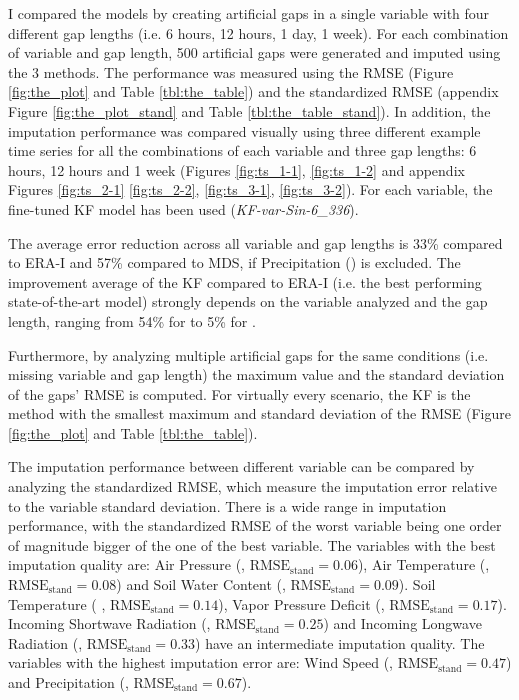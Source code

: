 \documentclass{article}
\begin{document}
I compared the models by creating artificial gaps in a single variable with four different gap lengths (i.e. 6 hours, 12 hours, 1 day, 1 week).
For each combination of variable and gap length, 500 artificial gaps were generated and imputed using the 3 methods. The performance was measured using the RMSE (Figure \ref{fig:the_plot} and Table \ref{tbl:the_table}) and the standardized RMSE (appendix Figure \ref{fig:the_plot_stand} and Table \ref{tbl:the_table_stand}). In addition, the imputation performance was compared visually using three different example time series for all the combinations of each variable and three gap lengths: 6 hours, 12 hours and 1 week (Figures \ref{fig:ts_1-1}, \ref{fig:ts_1-2} and appendix Figures \ref{fig:ts_2-1} \ref{fig:ts_2-2}, \ref{fig:ts_3-1}, \ref{fig:ts_3-2}). For each variable, the fine-tuned KF model has been used (\textit{KF-\textlangle var\textrangle-Sin-6\_336}).

The average error reduction across all variable and gap lengths is 33\% compared to ERA-I and 57\% compared to MDS, if Precipitation () is excluded.
The improvement average of the KF compared to ERA-I (i.e. the best performing state-of-the-art model) strongly depends on the variable analyzed and the gap length, ranging from 54\% for  to 5\% for .

Furthermore, by analyzing multiple artificial gaps for the same conditions (i.e. missing variable and gap length) the maximum value and the standard deviation of the gaps' RMSE is computed. For virtually every scenario, the KF is the method with the smallest maximum and standard deviation of the RMSE (Figure \ref{fig:the_plot} and Table \ref{tbl:the_table}).

The imputation performance between different variable can be compared by analyzing the standardized RMSE, which measure the imputation error relative to the variable standard deviation. There is a wide range in imputation performance, with the standardized RMSE of the worst variable being one order of magnitude bigger of the one of the best variable.
The variables with the best imputation quality are:
Air Pressure (, $\text{RMSE}_{\text{stand}} = 0.06$),
Air Temperature (, $\text{RMSE}_{\text{stand}} = 0.08$)
and Soil Water Content (, $\text{RMSE}_{\text{stand}} = 0.09$).
Soil Temperature ( , $\text{RMSE}_{\text{stand}} = 0.14$),
Vapor Pressure Deficit (, $\text{RMSE}_{\text{stand}} = 0.17$).
Incoming Shortwave Radiation (, $\text{RMSE}_{\text{stand}} = 0.25$) and
Incoming Longwave Radiation (, $\text{RMSE}_{\text{stand}} = 0.33$)
have an intermediate imputation quality.
The variables with the highest imputation error are: Wind Speed (, $\text{RMSE}_{\text{stand}} = 0.47$) and  Precipitation (, $\text{RMSE}_{\text{stand}} = 0.67$).
\end{document}
